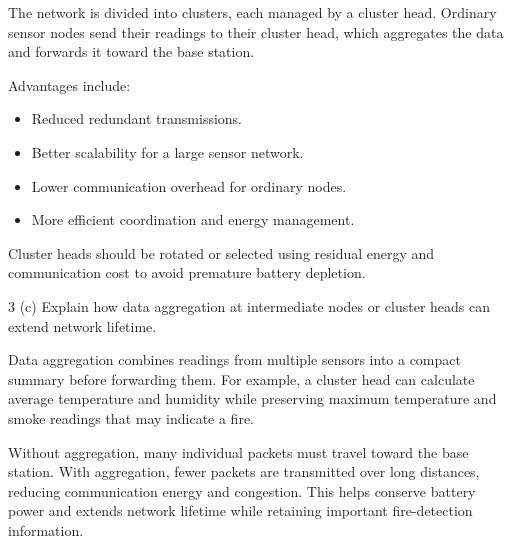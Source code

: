 The network is divided into clusters, each managed by a cluster head. Ordinary sensor nodes send their readings to
their cluster head, which aggregates the data and forwards it toward the base station.

Advantages include:
\begin{itemize}
\item Reduced redundant transmissions.
\item Better scalability for a large sensor network.
\item Lower communication overhead for ordinary nodes.
\item More efficient coordination and energy management.
\end{itemize}

Cluster heads should be rotated or selected using residual energy and communication cost to avoid premature
battery depletion.


\begin{question}{3 (c)}
Explain how data aggregation at intermediate nodes or cluster heads can extend network lifetime.
\end{question}

Data aggregation combines readings from multiple sensors into a compact summary before forwarding them. For
example, a cluster head can calculate average temperature and humidity while preserving maximum temperature and
smoke readings that may indicate a fire.

Without aggregation, many individual packets must travel toward the base station. With aggregation, fewer packets
are transmitted over long distances, reducing communication energy and congestion. This helps conserve battery
power and extends network lifetime while retaining important fire-detection information.
